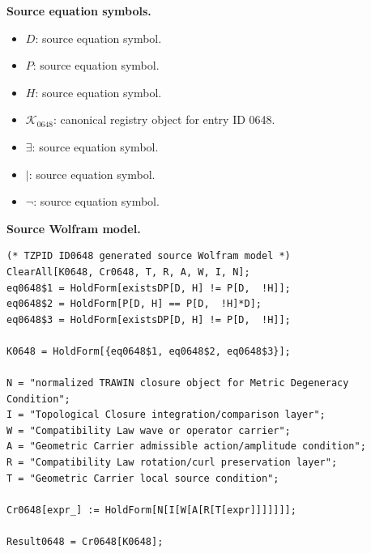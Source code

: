 \begin{minipage}[t]{0.49\linewidth}
\begingroup
\small
\raggedright
\textbf{Source equation symbols.}\par
\begin{itemize}[leftmargin=1.35em,itemsep=1pt,topsep=1pt,parsep=0pt]
    \item $D$: source equation symbol.
    \item $P$: source equation symbol.
    \item $H$: source equation symbol.
    \item $\mathcal{K}_{0648}$: canonical registry object for entry ID 0648.
    \item $\exists$: source equation symbol.
    \item $\mid$: source equation symbol.
    \item $\neg$: source equation symbol.
\end{itemize}
\endgroup
\end{minipage}\hfill
\begin{minipage}[t]{0.47\linewidth}
\begingroup
\scriptsize
\raggedright
\textbf{Source Wolfram model.}\par
\begin{Verbatim}[fontsize=\tiny,breaklines=true,breakanywhere=true]
(* TZPID ID0648 generated source Wolfram model *)
ClearAll[K0648, Cr0648, T, R, A, W, I, N];
eq0648$1 = HoldForm[existsDP[D, H] != P[D,  !H]];
eq0648$2 = HoldForm[P[D, H] == P[D,  !H]*D];
eq0648$3 = HoldForm[existsDP[D, H] != P[D,  !H]];

K0648 = HoldForm[{eq0648$1, eq0648$2, eq0648$3}];

N = "normalized TRAWIN closure object for Metric Degeneracy Condition";
I = "Topological Closure integration/comparison layer";
W = "Compatibility Law wave or operator carrier";
A = "Geometric Carrier admissible action/amplitude condition";
R = "Compatibility Law rotation/curl preservation layer";
T = "Geometric Carrier local source condition";

Cr0648[expr_] := HoldForm[N[I[W[A[R[T[expr]]]]]]];

Result0648 = Cr0648[K0648];
\end{Verbatim}
\endgroup
\end{minipage}

